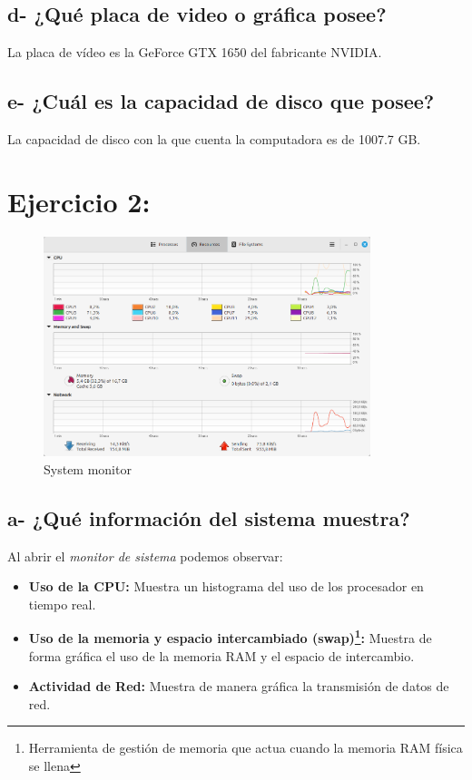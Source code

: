 \documentclass{article}
\begin{document}
\subsection*{d- ¿Qué placa de video o gráfica posee?}
\noindent
La placa de vídeo es la GeForce GTX 1650 del fabricante NVIDIA.

\subsection*{e- ¿Cuál es la capacidad de disco que posee?}
\noindent
La capacidad de disco con la que cuenta la computadora es de 1007.7 GB.


\section*{Ejercicio 2:}

\begin{figure}[h]
  \centering
  \includegraphics[width=0.85\textwidth]{resources/2.png}
  \caption{System monitor}
\end{figure}

\subsection*{a- ¿Qué información del sistema muestra?}

\noindent
Al abrir el \textit{monitor de sistema} podemos observar:

\begin{itemize}
    \item \textbf{Uso de la CPU:} Muestra un histograma del uso de los procesador en tiempo real.
    \item \textbf{Uso de la memoria y espacio intercambiado (swap)\footnote{Herramienta de gestión de memoria que actua cuando la memoria RAM física se llena}: }
    Muestra de forma gráfica el uso de la memoria RAM y el espacio de intercambio.
    \item \textbf{Actividad de Red: } Muestra de manera gráfica la transmisión de  datos de red.
\end{itemize}
\end{document}
